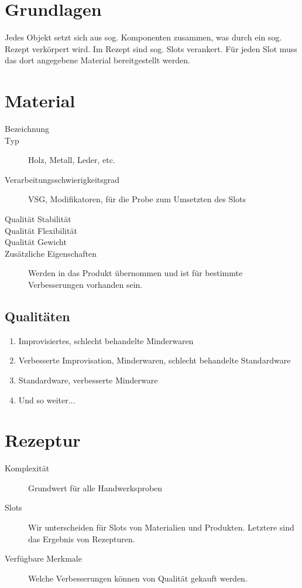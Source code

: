 \documentclass[a4paper,12pt,oneside]{book}
\begin{document}
\chapter{Grundlagen}
Jedes Objekt setzt sich aus sog. Komponenten zusammen, was durch ein sog. Rezept verkörpert wird. Im Rezept sind sog. Slots verankert. Für jeden Slot muss das dort angegebene Material bereitgestellt werden.

\chapter{Material}
\begin{description}
\item[Bezeichnung]
\item[Typ]Holz, Metall, Leder, etc.
\item[Verarbeitungsschwierigkeitsgrad]VSG, Modifikatoren, für die Probe zum Umsetzten des Slots
\item[Qualität Stabilität]
\item[Qualität Flexibilität]
\item[Qualität Gewicht]
\item[Zusätzliche Eigenschaften]Werden in das Produkt übernommen und ist für bestimmte Verbesserungen vorhanden sein.
\end{description}

\section{Qualitäten}
\begin{enumerate}
\item Improvisiertes, schlecht behandelte Minderwaren
\item Verbesserte Improvisation, Minderwaren, schlecht behandelte Standardware
\item Standardware, verbesserte Minderware
\item Und so weiter...
\end{enumerate}


\chapter{Rezeptur}
\begin{description}
\item[Komplexität]Grundwert für alle Handwerksproben
\item[Slots]Wir unterscheiden für Slots von Materialien und Produkten. Letztere sind das Ergebnis von Rezepturen.
\item[Verfügbare Merkmale]Welche Verbesserungen können von Qualität gekauft werden.
\end{description}
\end{document}
